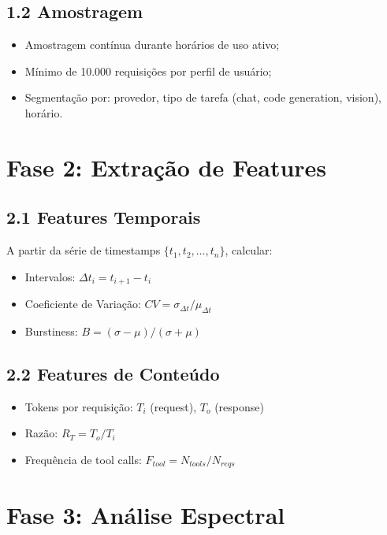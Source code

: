 \documentclass[12pt,openright,oneside,a4paper]{abntex2}
\begin{document}
\subsection{1.2 Amostragem}
\begin{itemize}
    \item Amostragem contínua durante horários de uso ativo;
    \item Mínimo de 10.000 requisições por perfil de usuário;
    \item Segmentação por: provedor, tipo de tarefa (chat, code generation, vision), horário.
\end{itemize}

\section{Fase 2: Extração de Features}

\subsection{2.1 Features Temporais}

A partir da série de timestamps $\{t_1, t_2, \ldots, t_n\}$, calcular:
\begin{itemize}
    \item Intervalos: $\Delta t_i = t_{i+1} - t_i$
    \item Coeficiente de Variação: $CV = \sigma_{\Delta t} / \mu_{\Delta t}$
    \item Burstiness: $B = (\sigma - \mu) / (\sigma + \mu)$
\end{itemize}

\subsection{2.2 Features de Conteúdo}
\begin{itemize}
    \item Tokens por requisição: $T_i$ (request), $T_o$ (response)
    \item Razão: $R_T = T_o / T_i$
    \item Frequência de tool calls: $F_{tool} = N_{tools} / N_{reqs}$
\end{itemize}

\section{Fase 3: Análise Espectral}
\end{document}
